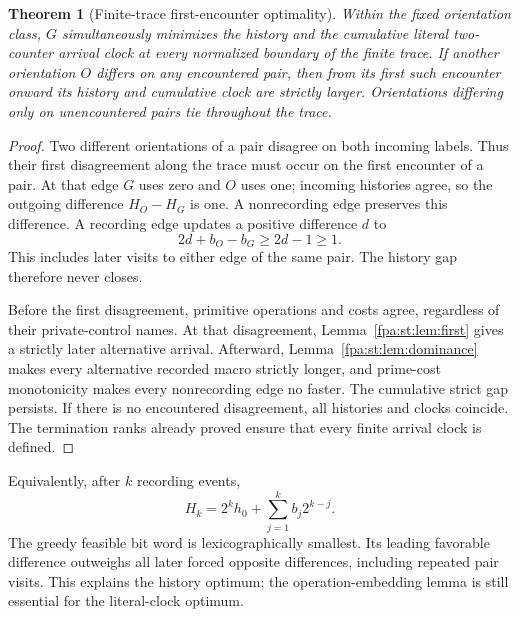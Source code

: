 \documentclass[11pt,a4paper]{article}
\numberwithin{equation}{section}
\newtheorem{theorem}{Theorem}[section]
\begin{document}
\begin{theorem}[Finite-trace first-encounter optimality]
\label{fpa:st:thm:greedy}
Within the fixed orientation class, $G$ simultaneously minimizes the history
and the cumulative literal two-counter arrival clock at every normalized
boundary of the finite trace. If another orientation $O$ differs on any
encountered pair, then from its first such encounter onward its history and
cumulative clock are strictly larger. Orientations differing only on
unencountered pairs tie throughout the trace.
\end{theorem}
\begin{proof}
Two different orientations of a pair disagree on both incoming labels.
Thus their first disagreement along the trace must occur on the first
encounter of a pair. At that edge $G$ uses zero and $O$ uses one; incoming
histories agree, so the outgoing difference $H_O-H_G$ is one. A
nonrecording edge preserves this difference. A recording edge updates a
positive difference $d$ to
\[
 2d+b_O-b_G\geq2d-1\geq1.
\]
This includes later visits to either edge of the same pair. The history gap
therefore never closes.

Before the first disagreement, primitive operations and costs agree,
regardless of their private-control names. At that disagreement,
Lemma~\ref{fpa:st:lem:first} gives a strictly later alternative arrival. Afterward,
Lemma~\ref{fpa:st:lem:dominance} makes every alternative recorded macro strictly
longer, and prime-cost monotonicity makes every nonrecording edge no faster.
The cumulative strict gap persists. If there is no encountered disagreement,
all histories and clocks coincide. The termination ranks already proved
ensure that every finite arrival clock is defined.
\end{proof}

Equivalently, after $k$ recording events,
\[
 H_k=2^k h_0+\sum_{j=1}^{k}b_j2^{k-j}.
\]
The greedy feasible bit word is lexicographically smallest. Its leading
favorable difference outweighs all later forced opposite differences,
including repeated pair visits. This explains the history optimum; the
operation-embedding lemma is still essential for the literal-clock optimum.
\end{document}
